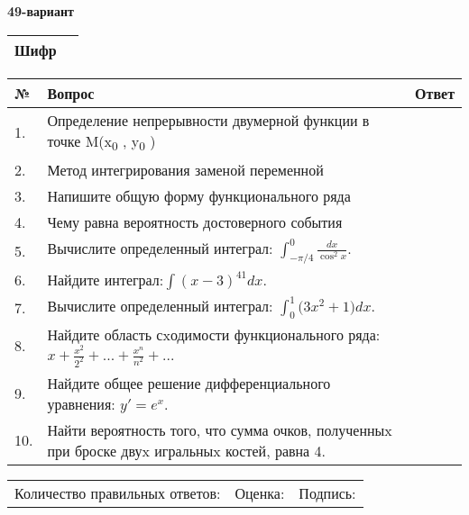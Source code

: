 \documentclass{article}
\begin{document}
  \egroup
  
  \newpage
  
  
  \textbf{49-вариант}\\
  
  \bgroup
  \def\arraystretch{1.6} %
  
  \begin{tabular}{|m{5.7cm}|m{9.5cm}|}
  \hline
  Шифр & \\
  \hline
  \end{tabular}
  
  \vspace{1cm}
  
  \begin{tabular}{|m{0.7cm}|m{10cm}|m{4cm}|}
  \hline
  № & Вопрос & Ответ \\
  \hline
  1. & Определение непрерывности двумерной функции в точке M(x\textsubscript{0} , y\textsubscript{0} ) &  \\
  \hline
  2. & Метод интегрирования заменой переменной &  \\
  \hline
  3. & Напишите общую форму функционального ряда &  \\
  \hline
  4. & Чему равна вероятность достоверного события &  \\
  \hline
  5. & Вычислите определенный интеграл: \(\int_{-\pi/4}^{0}\frac{dx}{\cos^2x}\). &  \\
  \hline
  6. & Найдите интеграл:\(\int{(x - 3)^{41}}dx\). &  \\
  \hline
  7. & Вычислите определенный интеграл: \(\int_{0}^{1}{(3x^{2}} + 1)dx\). &  \\
  \hline
  8. & Найдите область сxодимости функционального ряда: \(x + \frac{x^{2}}{2^{2}} + ... + \frac{x^{n}}{n^{2}} + ...\) &  \\
  \hline
  9. & Найдите общее решение дифференциального уравнения: \(y' = e^{x}\). &  \\
  \hline
  10. & Найти вероятность того, что сумма очков, полученныx при броске двуx игральныx костей, равна 4. &  \\
  \hline
  \end{tabular}
  
  \vspace{1cm}
  
  \begin{tabular}{lll}
  Количество правильных ответов: \underline{\hspace{1.5cm}} & 
  Оценка: \underline{\hspace{1.5cm}} & 
  Подпись: \underline{\hspace{2cm}} \\
  \end{tabular}
  
\end{document}
